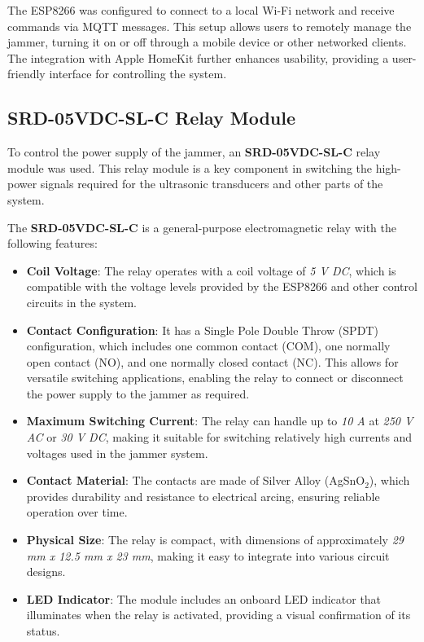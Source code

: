 The ESP8266 was configured to connect to a local Wi-Fi network and receive commands via MQTT messages. This setup allows users to remotely manage the jammer, turning it on or off through a mobile device or other networked clients. The integration with Apple HomeKit further enhances usability, providing a user-friendly interface for controlling the system.

\subsection{SRD-05VDC-SL-C Relay Module}

To control the power supply of the jammer, an \textbf{SRD-05VDC-SL-C} relay module was used. This relay module is a key component in switching the high-power signals required for the ultrasonic transducers and other parts of the system.

The \textbf{SRD-05VDC-SL-C} is a general-purpose electromagnetic relay with the following features:

\begin{itemize}
    \item \textbf{Coil Voltage}: The relay operates with a coil voltage of \textit{5 V DC}, which is compatible with the voltage levels provided by the ESP8266 and other control circuits in the system.
    
    \item \textbf{Contact Configuration}: It has a Single Pole Double Throw (SPDT) configuration, which includes one common contact (COM), one normally open contact (NO), and one normally closed contact (NC). This allows for versatile switching applications, enabling the relay to connect or disconnect the power supply to the jammer as required.
    
    \item \textbf{Maximum Switching Current}: The relay can handle up to \textit{10 A} at \textit{250 V AC} or \textit{30 V DC}, making it suitable for switching relatively high currents and voltages used in the jammer system.
    
    \item \textbf{Contact Material}: The contacts are made of Silver Alloy (AgSnO\(_2\)), which provides durability and resistance to electrical arcing, ensuring reliable operation over time.
    
    \item \textbf{Physical Size}: The relay is compact, with dimensions of approximately \textit{29 mm x 12.5 mm x 23 mm}, making it easy to integrate into various circuit designs.
    
    \item \textbf{LED Indicator}: The module includes an onboard LED indicator that illuminates when the relay is activated, providing a visual confirmation of its status.
\end{itemize}

